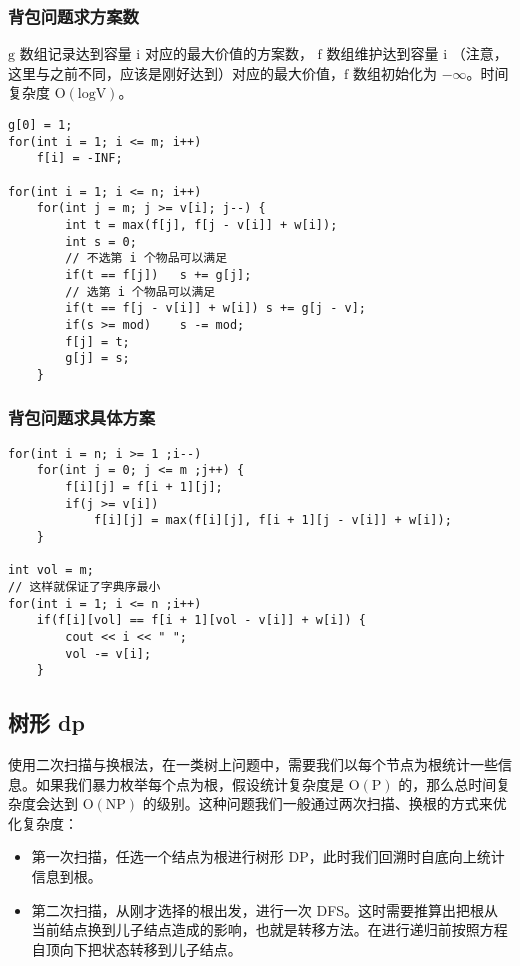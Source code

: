 \documentclass[UTF8]{article}
\begin{document}
\subsubsection{背包问题求方案数}
$\mathrm{g}$ 数组记录达到容量 $\mathrm{i}$ 对应的最大价值的方案数， $\mathrm{f}$ 数组维护达到容量 $\mathrm{i}$ （注意，这里与之前不同，应该是刚好达到）对应的最大价值，$\mathrm{f}$ 数组初始化为 $\mathrm{-\infty}$。时间复杂度 $\mathrm{O(logV)}$。
\begin{lstlisting}[caption=背包问题求方案数]
g[0] = 1;
for(int i = 1; i <= m; i++)
	f[i] = -INF;

for(int i = 1; i <= n; i++)
	for(int j = m; j >= v[i]; j--) {
		int t = max(f[j], f[j - v[i]] + w[i]);
		int s = 0;
		// 不选第 i 个物品可以满足
		if(t == f[j])	s += g[j];
		// 选第 i 个物品可以满足
		if(t == f[j - v[i]] + w[i])	s += g[j - v];
		if(s >= mod)	s -= mod;
		f[j] = t;
		g[j] = s;
	}
\end{lstlisting}


\subsubsection{背包问题求具体方案}
\begin{lstlisting}[caption=背包问题求具体方案]
for(int i = n; i >= 1 ;i--)
	for(int j = 0; j <= m ;j++) {
		f[i][j] = f[i + 1][j];
		if(j >= v[i])
			f[i][j] = max(f[i][j], f[i + 1][j - v[i]] + w[i]);
	}

int vol = m;
// 这样就保证了字典序最小
for(int i = 1; i <= n ;i++) 
	if(f[i][vol] == f[i + 1][vol - v[i]] + w[i]) {
		cout << i << " ";
		vol -= v[i];
	}
\end{lstlisting}


\subsection{树形 dp}
使用二次扫描与换根法，在一类树上问题中，需要我们以每个节点为根统计一些信息。如果我们暴力枚举每个点为根，假设统计复杂度是 $\mathrm{O(P)}$ 的，那么总时间复杂度会达到 $\mathrm{O(NP)}$ 的级别。这种问题我们一般通过两次扫描、换根的方式来优化复杂度：

\begin{itemize}
	\item 第一次扫描，任选一个结点为根进行树形 DP，此时我们回溯时自底向上统计信息到根。
	\item 第二次扫描，从刚才选择的根出发，进行一次 DFS。这时需要推算出把根从当前结点换到儿子结点造成的影响，也就是转移方法。在进行递归前按照方程自顶向下把状态转移到儿子结点。
\end{itemize}
\end{document}
